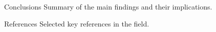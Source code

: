 \documentclass[final]{beamer}
\begin{document}
\begin{frame}{}
\begin{columns}[t]
\begin{column}{.32\linewidth}
      \begin{block}{Conclusions}
        Summary of the main findings and their implications.
      \end{block}
      
      \begin{block}{References}
        Selected key references in the field.
      \end{block}
    \end{column}
  \end{columns}
\end{frame}
\end{document}
